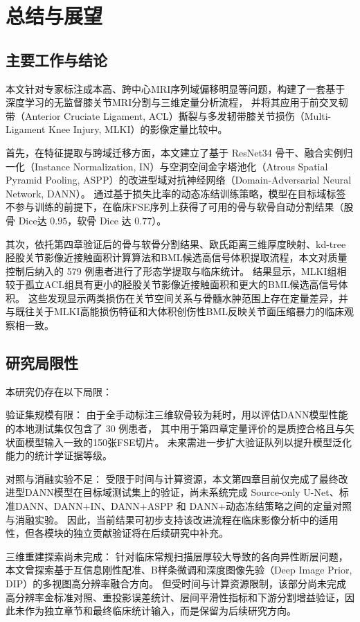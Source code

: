 
\chapter{总结与展望}

\section{主要工作与结论}
  本文针对专家标注成本高、跨中心MRI序列域偏移明显等问题，构建了一套基于深度学习的无监督膝关节MRI分割与三维定量分析流程，
  并将其应用于前交叉韧带（Anterior Cruciate Ligament, ACL）撕裂与多发韧带膝关节损伤（Multi-Ligament Knee Injury, MLKI）的影像定量比较中。
  \par 首先，在特征提取与跨域迁移方面，本文建立了基于 ResNet34 骨干、融合实例归一化（Instance Normalization, IN）与空洞空间金字塔池化（Atrous Spatial Pyramid Pooling, ASPP）的改进型域对抗神经网络（Domain-Adversarial Neural Network, DANN）。
  通过基于损失比率的动态冻结训练策略，模型在目标域标签不参与训练的前提下，在临床FSE序列上获得了可用的骨与软骨自动分割结果（股骨 Dice达 $0.95$，软骨 Dice 达 $0.77$）。
  \par 其次，依托第四章验证后的骨与软骨分割结果、欧氏距离三维厚度映射、kd-tree胫股关节影像近接触面积计算算法和BML候选高信号体积提取流程，本文对质量控制后纳入的 \num{579} 例患者进行了形态学提取与临床统计。
  结果显示，MLKI组相较于孤立ACL组具有更小的胫股关节影像近接触面积和更大的BML候选高信号体积。
  这些发现显示两类损伤在关节空间关系与骨髓水肿范围上存在定量差异，并与既往关于MLKI高能损伤特征和大体积创伤性BML反映关节面压缩暴力的临床观察相一致。

\section{研究局限性}
  本研究仍存在以下局限：
  \par 验证集规模有限：
  由于全手动标注三维软骨较为耗时，用以评估DANN模型性能的本地测试集仅包含了 30 例患者，
  其中用于第四章定量评价的是质控合格且与矢状面模型输入一致的150张FSE切片。
  未来需进一步扩大验证队列以提升模型泛化能力的统计学证据等级。
  \par 对照与消融实验不足：
  受限于时间与计算资源，本文第四章目前仅完成了最终改进型DANN模型在目标域测试集上的验证，尚未系统完成 Source-only U-Net、标准DANN、DANN+IN、DANN+ASPP 和 DANN+动态冻结策略之间的定量对照与消融实验。
  因此，当前结果可初步支持该改进流程在临床影像分析中的适用性，但各模块的独立贡献验证将在后续研究中补充。
  \par 三维重建探索尚未完成：
  针对临床常规扫描层厚较大导致的各向异性断层问题，本文曾探索基于互信息刚性配准、B样条微调和深度图像先验（Deep Image Prior, DIP）的多视图高分辨率融合方向。
  但受时间与计算资源限制，该部分尚未完成高分辨率金标准对照、重投影误差统计、层间平滑性指标和下游分割增益验证，因此未作为独立章节和最终临床统计输入，而是保留为后续研究方向。

